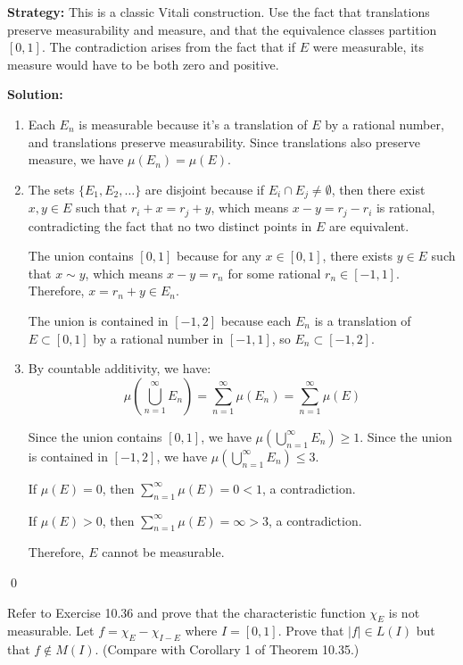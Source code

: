 \noindent\textbf{Strategy:} This is a classic Vitali construction. Use the fact that translations preserve measurability and measure, and that the equivalence classes partition $[0,1]$. The contradiction arises from the fact that if $E$ were measurable, its measure would have to be both zero and positive.

\bigskip\noindent\textbf{Solution:}
\begin{enumerate}[label=(\alph*)]
\item Each $E_n$ is measurable because it's a translation of $E$ by a rational number, and translations preserve measurability. Since translations also preserve measure, we have $\mu(E_n) = \mu(E)$.

\item The sets $\{E_1, E_2, \ldots \}$ are disjoint because if $E_i \cap E_j \neq \emptyset$, then there exist $x, y \in E$ such that $r_i + x = r_j + y$, which means $x - y = r_j - r_i$ is rational, contradicting the fact that no two distinct points in $E$ are equivalent.

The union contains $[0, 1]$ because for any $x \in [0, 1]$, there exists $y \in E$ such that $x \sim y$, which means $x - y = r_n$ for some rational $r_n \in [-1, 1]$. Therefore, $x = r_n + y \in E_n$.

The union is contained in $[-1, 2]$ because each $E_n$ is a translation of $E \subset [0, 1]$ by a rational number in $[-1, 1]$, so $E_n \subset [-1, 2]$.

\item By countable additivity, we have:
\[\mu\left(\bigcup_{n=1}^{\infty} E_n\right) = \sum_{n=1}^{\infty} \mu(E_n) = \sum_{n=1}^{\infty} \mu(E)\]

Since the union contains $[0, 1]$, we have $\mu(\bigcup_{n=1}^{\infty} E_n) \geq 1$. Since the union is contained in $[-1, 2]$, we have $\mu(\bigcup_{n=1}^{\infty} E_n) \leq 3$.

If $\mu(E) = 0$, then $\sum_{n=1}^{\infty} \mu(E) = 0 < 1$, a contradiction.

If $\mu(E) > 0$, then $\sum_{n=1}^{\infty} \mu(E) = \infty > 3$, a contradiction.

Therefore, $E$ cannot be measurable.
\end{enumerate}\qed


\begin{problembox}
\begin{problemstatement}
Refer to Exercise 10.36 and prove that the characteristic function $\chi_E$ is not measurable. Let $f = \chi_E - \chi_{I-E}$ where $I = [0, 1]$. Prove that $|f| \in L(I)$ but that $f \notin M(I)$. (Compare with Corollary 1 of Theorem 10.35.)
\end{problemstatement}
\end{problembox}

